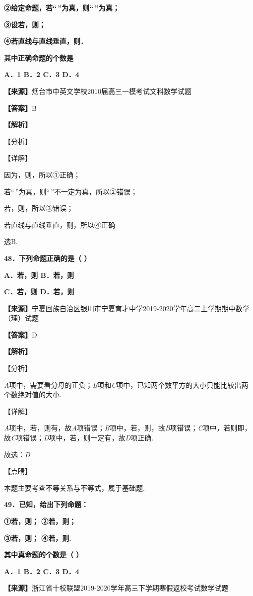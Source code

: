 \textbf{②给定命题，若``\,''为真，则``\,''为真；}

\textbf{③设若，则；}

\textbf{④若直线与直线垂直，则．}

\textbf{其中正确命题的个数是}

\textbf{A．1 B．2 C．3 D．4}

\textbf{【来源】}烟台市中英文学校2010届高三一模考试文科数学试题

\textbf{【答案】}B

\textbf{【解析】}

【分析】

【详解】

因为，则，所以①正确；

若``\,''为真，则``\,''不一定为真，所以②错误；

若，则，所以③错误；

若直线与直线垂直，则，所以④正确

选B.

\textbf{48．下列命题正确的是（ ）}

\textbf{A．若，则 B．若，则}

\textbf{C．若，则 D．若，则}

\textbf{【来源】}宁夏回族自治区银川市宁夏育才中学2019-2020学年高二上学期期中数学（理）试题

\textbf{【答案】}D

\textbf{【解析】}

【分析】

\emph{A}项中，需要看分母的正负；\emph{B}项和\emph{C}项中，已知两个数平方的大小只能比较出两个数绝对值的大小.

【详解】

\emph{A}项中，若，则有，故\emph{A}项错误；\emph{B}项中，若，则，故\emph{B}项错误；\emph{C}项中，若则即，故\emph{C}项错误；\emph{D}项中，若，则一定有，故\emph{D}项正确.

故选：\emph{D}

【点睛】

本题主要考查不等关系与不等式，属于基础题.

\textbf{49．已知，给出下列命题：}

\textbf{①若，则； ②若，则；}

\textbf{③若，则； ④若，则.}

\textbf{其中真命题的个数是（ ）}

\textbf{A．1 B．2 C．3 D．4}

\textbf{【来源】}浙江省十校联盟2019-2020学年高三下学期寒假返校考试数学试题

